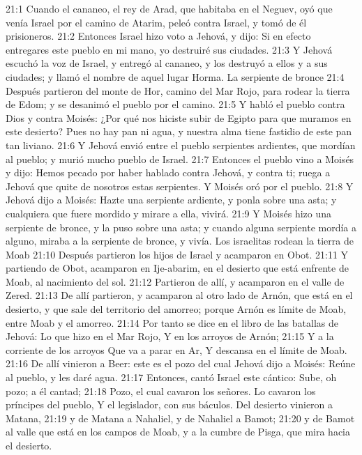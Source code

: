 21:1 Cuando el cananeo, el rey de Arad, que habitaba en el Neguev, oyó que venía Israel  por el camino de Atarim, peleó contra Israel, y tomó de él prisioneros.  
21:2 Entonces Israel hizo voto a Jehová, y dijo: Si en efecto entregares este pueblo en mi mano, yo destruiré sus ciudades.  
21:3 Y Jehová escuchó la voz de Israel, y entregó al cananeo, y los destruyó a ellos y a sus ciudades; y llamó el nombre de aquel lugar Horma.  
La serpiente de bronce 
21:4 Después partieron del monte de Hor, camino del Mar Rojo, para rodear la tierra de Edom; y se desanimó el pueblo por el camino.  
21:5 Y habló el pueblo contra Dios y contra Moisés: ¿Por qué nos hiciste subir de Egipto para que muramos en este desierto? Pues no hay pan ni agua, y nuestra alma tiene fastidio de este pan tan liviano.  
21:6 Y Jehová envió entre el pueblo serpientes ardientes, que mordían al pueblo; y murió mucho pueblo de Israel.  
21:7 Entonces el pueblo vino a Moisés y dijo: Hemos pecado por haber hablado contra Jehová, y contra ti; ruega a Jehová que quite de nosotros estas serpientes. Y Moisés oró por el pueblo.  
21:8 Y Jehová dijo a Moisés: Hazte una serpiente ardiente, y ponla sobre una asta; y cualquiera que fuere mordido y mirare a ella, vivirá.  
21:9 Y Moisés hizo una serpiente de bronce, y la puso sobre una asta; y cuando alguna serpiente mordía a alguno, miraba a la serpiente de bronce, y vivía.  
Los israelitas rodean la tierra de Moab  
21:10 Después partieron los hijos de Israel y acamparon en Obot.  
21:11 Y partiendo de Obot, acamparon en Ije-abarim, en el desierto que está enfrente de Moab, al nacimiento del sol.  
21:12 Partieron de allí, y acamparon en el valle de Zered.  
21:13 De allí partieron, y acamparon al otro lado de Arnón, que está en el desierto, y que sale del territorio del amorreo; porque Arnón es límite de Moab, entre Moab y el amorreo.  
21:14 Por tanto se dice en el libro de las batallas de Jehová:  
Lo que hizo en el Mar Rojo,  
Y en los arroyos de Arnón;  
21:15 Y a la corriente de los arroyos  
Que va a parar en Ar,  
Y descansa en el límite de Moab. 
21:16 De allí vinieron a Beer: este es el pozo del cual Jehová dijo a Moisés: Reúne al pueblo, y les daré agua.  
21:17 Entonces, cantó Israel este cántico:  
Sube, oh pozo; a él cantad; 
21:18 Pozo, el cual cavaron los señores.  
Lo cavaron los príncipes del pueblo,  
Y el legislador, con sus báculos.  
Del desierto vinieron a Matana, 
21:19 y de Matana a Nahaliel, y de Nahaliel a Bamot;  
21:20 y de Bamot al valle que está en los campos de Moab, y a la cumbre de Pisga, que mira hacia el desierto.  
